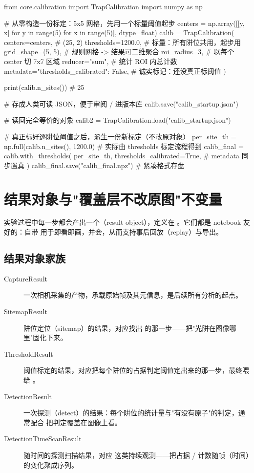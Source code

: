 \documentclass[11pt,oneside,openany]{book}
\begin{document}
\begin{codeblock}[Python]
from core.calibration import TrapCalibration
import numpy as np

# 从零构造一份标定：5x5 网格，先用一个标量阈值起步
centers = np.array([[y, x] for y in range(5) for x in range(5)], dtype=float)
calib = TrapCalibration(
    centers=centers,          # (25, 2)
    thresholds=1200.0,        # 标量：所有阱位共用，起步用
    grid_shape=(5, 5),        # 规则网格 -> 结果可二维聚合
    roi_radius=3,             # 以每个 center 切 7x7 区域
    reducer="sum",            # 统计 ROI 内总计数
    metadata={"thresholds_calibrated": False},  # 诚实标记：还没真正标阈值
)

print(calib.n_sites())        # 25

# 存成人类可读 JSON，便于审阅 / 进版本库
calib.save("calib_startup.json")

# 读回完全等价的对象
calib2 = TrapCalibration.load("calib_startup.json")
\end{codeblock}

\begin{codeblock}[Python]
# 真正标好逐阱位阈值之后，派生一份新标定（不改原对象）
per_site_th = np.full(calib.n_sites(), 1200.0)  # 实际由 thresholds 标定流程得到
calib_final = calib.with_thresholds(
    per_site_th,
    thresholds_calibrated=True,   # metadata 同步置真
)
calib_final.save("calib_final.npz")   # 紧凑格式存盘
\end{codeblock}

\section{结果对象与"覆盖层不改原图"不变量}

实验过程中每一步都会产出一个（result object），定义在 。它们都是 notebook 友好的：自带  用于即看即画，并会，从而支持事后回放（replay）与导出。

\subsection{结果对象家族}

\begin{description}
\item[CaptureResult] 一次相机采集的产物，承载原始帧及其元信息，是后续所有分析的起点。
\item[SitemapResult] 阱位定位（sitemap）的结果，对应找出  的那一步——把"光阱在图像哪里"固化下来。
\item[ThresholdResult] 阈值标定的结果，对应把每个阱位的占据判定阈值定出来的那一步，最终喂给 。
\item[DetectionResult] 一次探测（detect）的结果：每个阱位的统计量与"有没有原子"的判定，通常配合  把判定覆盖在图像上看。
\item[DetectionTimeScanResult] 随时间的探测扫描结果，对应  这类持续观测——把占据 / 计数随帧（时间）的变化聚成序列。
\end{description}
\end{document}
